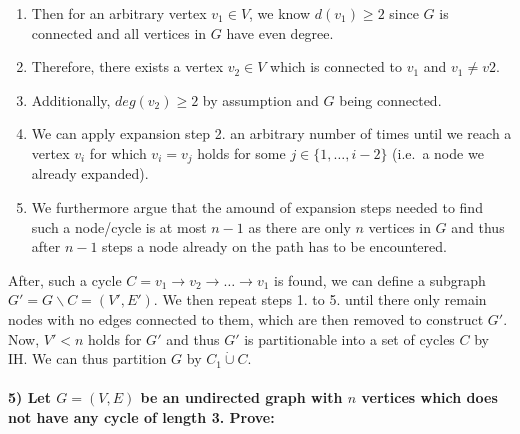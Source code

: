 \documentclass[
]{article}
\providecommand{\tightlist}{%
  \setlength{\itemsep}{0pt}\setlength{\parskip}{0pt}}
\begin{document}
\begin{itemize}
\begin{itemize}
\begin{itemize}
\begin{itemize}
        \begin{enumerate}
        \def\labelenumi{\arabic{enumi}.}
        \tightlist
        \item
          Then for an arbitrary vertex \(v_1 \in V\), we know
          \(d(v_1) \geq 2\) since \(G\) is connected and all vertices in
          \(G\) have even degree.
        \item
          Therefore, there exists a vertex \(v_2 \in V\) which is
          connected to \(v_1\) and \(v_1 \neq v2\).
        \item
          Additionally, \(deg(v_2) \geq 2\) by assumption and \(G\)
          being connected.
        \item
          We can apply expansion step 2. an arbitrary number of times
          until we reach a vertex \(v_i\) for which \(v_i = v_j\) holds
          for some \(j \in \{1, \dots, i-2\}\) (i.e.~a node we already
          expanded).
        \item
          We furthermore argue that the amound of expansion steps needed
          to find such a node/cycle is at most \(n-1\) as there are only
          \(n\) vertices in \(G\) and thus after \(n-1\) steps a node
          already on the path has to be encountered.
        \end{enumerate}

        After, such a cycle
        \(C = v_1 \rightarrow v_2 \rightarrow \dots \rightarrow v_1\) is
        found, we can define a subgraph
        \(G' = G \backslash C = (V',E')\). We then repeat steps 1. to 5.
        until there only remain nodes with no edges connected to them,
        which are then removed to construct \(G'\). Now, \(V' < n\)
        holds for \(G'\) and thus \(G'\) is partitionable into a set of
        cycles \(C\) by IH. We can thus partition \(G\) by
        \(C_1 \dot \cup C\).
      \end{itemize}
    \end{itemize}
  \end{itemize}
\end{itemize}

\hypertarget{let-g-ve-be-an-undirected-graph-with-n-vertices-which-does-not-have-any-cycle-of-length-3.-prove}{%
\paragraph{\texorpdfstring{5) Let \(G = (V,E)\) be an undirected graph
with \(n\) vertices which does not have any cycle of length 3.
Prove:}{5) Let G = (V,E) be an undirected graph with n vertices which does not have any cycle of length 3. Prove:}}\label{let-g-ve-be-an-undirected-graph-with-n-vertices-which-does-not-have-any-cycle-of-length-3.-prove}}
\end{document}
